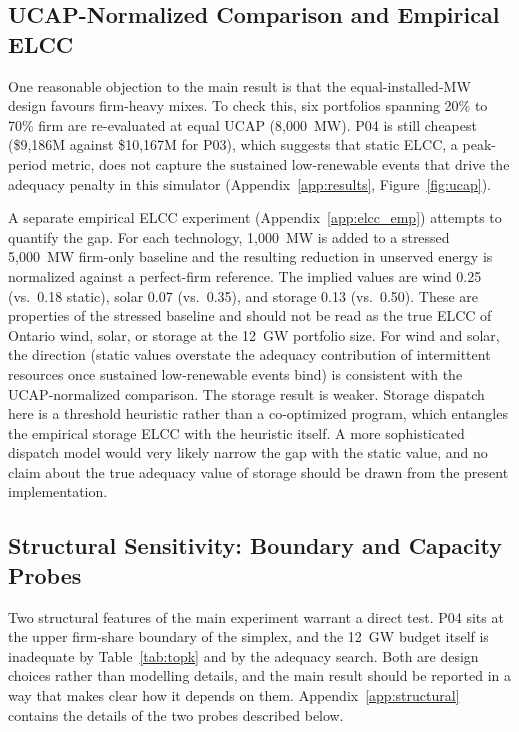 \documentclass[11pt]{article}
\begin{document}
\subsection{UCAP-Normalized Comparison and Empirical ELCC}

One reasonable objection to the main result is that the equal-installed-MW design favours firm-heavy mixes. To check this, six portfolios spanning 20\% to 70\% firm are re-evaluated at equal UCAP (8{,}000~MW). P04 is still cheapest (\$9{,}186M against \$10{,}167M for P03), which suggests that static ELCC, a peak-period metric, does not capture the sustained low-renewable events that drive the adequacy penalty in this simulator (Appendix~\ref{app:results}, Figure~\ref{fig:ucap}).

A separate empirical ELCC experiment (Appendix~\ref{app:elcc_emp}) attempts to quantify the gap. For each technology, 1{,}000~MW is added to a stressed 5{,}000~MW firm-only baseline and the resulting reduction in unserved energy is normalized against a perfect-firm reference. The implied values are wind 0.25 (vs.\ 0.18 static), solar 0.07 (vs.\ 0.35), and storage 0.13 (vs.\ 0.50). These are properties of the stressed baseline and should not be read as the true ELCC of Ontario wind, solar, or storage at the 12~GW portfolio size. For wind and solar, the direction (static values overstate the adequacy contribution of intermittent resources once sustained low-renewable events bind) is consistent with the UCAP-normalized comparison. The storage result is weaker. Storage dispatch here is a threshold heuristic rather than a co-optimized program, which entangles the empirical storage ELCC with the heuristic itself. A more sophisticated dispatch model would very likely narrow the gap with the static value, and no claim about the true adequacy value of storage should be drawn from the present implementation.

\subsection{Structural Sensitivity: Boundary and Capacity Probes}\label{sec:extensions}

Two structural features of the main experiment warrant a direct test. P04 sits at the upper firm-share boundary of the simplex, and the 12~GW budget itself is inadequate by Table~\ref{tab:topk} and by the adequacy search. Both are design choices rather than modelling details, and the main result should be reported in a way that makes clear how it depends on them. Appendix~\ref{app:structural} contains the details of the two probes described below.
\end{document}
